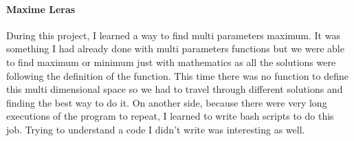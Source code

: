 \documentclass[12pt,oneside,a4paper]{article}
\begin{document}
\paragraph{Maxime Leras}
During this project, I learned a way to find multi parameters maximum. It was something
I had already done with multi parameters functions but we were able to find maximum
or minimum just with mathematics as all the solutions were following the definition of the function.
This time there was no function to define this multi dimensional space so we had to travel
through different solutions and finding the best way to do it.
On another side, because there were very long executions of the program to repeat, I learned
to write bash scripts to do this job. Trying to understand a code I didn't write was interesting as well.
\end{document}
